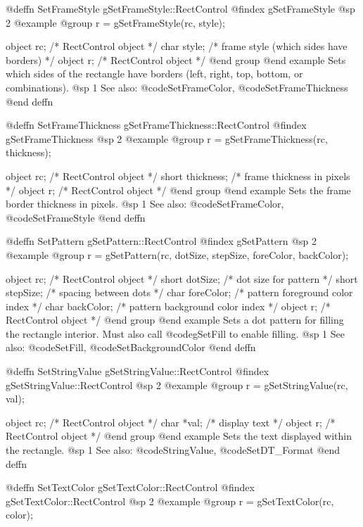 @deffn {SetFrameStyle} gSetFrameStyle::RectControl
@findex gSetFrameStyle
@sp 2
@example
@group
r = gSetFrameStyle(rc, style);

object  rc;     /*  RectControl object                     */
char    style;  /*  frame style (which sides have borders) */
object  r;      /*  RectControl object                     */
@end group
@end example
Sets which sides of the rectangle have borders (left, right, top,
bottom, or combinations).
@sp 1
See also:  @code{SetFrameColor}, @code{SetFrameThickness}
@end deffn



@deffn {SetFrameThickness} gSetFrameThickness::RectControl
@findex gSetFrameThickness
@sp 2
@example
@group
r = gSetFrameThickness(rc, thickness);

object  rc;          /*  RectControl object        */
short   thickness;   /*  frame thickness in pixels  */
object  r;           /*  RectControl object         */
@end group
@end example
Sets the frame border thickness in pixels.
@sp 1
See also:  @code{SetFrameColor}, @code{SetFrameStyle}
@end deffn



@deffn {SetPattern} gSetPattern::RectControl
@findex gSetPattern
@sp 2
@example
@group
r = gSetPattern(rc, dotSize, stepSize, foreColor, backColor);

object  rc;         /*  RectControl object                 */
short   dotSize;    /*  dot size for pattern               */
short   stepSize;   /*  spacing between dots               */
char    foreColor;  /*  pattern foreground color index      */
char    backColor;  /*  pattern background color index      */
object  r;          /*  RectControl object                 */
@end group
@end example
Sets a dot pattern for filling the rectangle interior.  Must also call
@code{gSetFill} to enable filling.
@sp 1
See also:  @code{SetFill}, @code{SetBackgroundColor}
@end deffn



@deffn {SetStringValue} gSetStringValue::RectControl
@findex gSetStringValue::RectControl
@sp 2
@example
@group
r = gSetStringValue(rc, val);

object  rc;    /*  RectControl object  */
char    *val;  /*  display text        */
object  r;     /*  RectControl object  */
@end group
@end example
Sets the text displayed within the rectangle.
@sp 1
See also:  @code{StringValue}, @code{SetDT_Format}
@end deffn



@deffn {SetTextColor} gSetTextColor::RectControl
@findex gSetTextColor::RectControl
@sp 2
@example
@group
r = gSetTextColor(rc, color);

